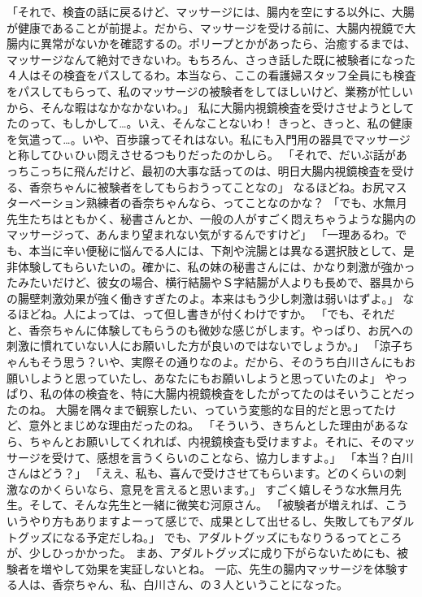 「それで、検査の話に戻るけど、マッサージには、腸内を空にする以外に、大腸が健康であることが前提よ。だから、マッサージを受ける前に、大腸内視鏡で大腸内に異常がないかを確認するの。ポリープとかがあったら、治癒するまでは、マッサージなんて絶対できないわ。もちろん、さっき話した既に被験者になった４人はその検査をパスしてるわ。本当なら、ここの看護婦スタッフ全員にも検査をパスしてもらって、私のマッサージの被験者をしてほしいけど、業務が忙しいから、そんな暇はなかなかないわ。」
私に大腸内視鏡検査を受けさせようとしてたのって、もしかして…。いえ、そんなことないわ！
きっと、きっと、私の健康を気遣って…。いや、百歩譲ってそれはない。私にも入門用の器具でマッサージと称してひぃひぃ悶えさせるつもりだったのかしら。
「それで、だいぶ話があっちこっちに飛んだけど、最初の大事な話ってのは、明日大腸内視鏡検査を受ける、香奈ちゃんに被験者をしてもらおうってことなの」
なるほどね。お尻マスターベーション熟練者の香奈ちゃんなら、ってことなのかな？
「でも、水無月先生たちはともかく、秘書さんとか、一般の人がすごく悶えちゃうような腸内のマッサージって、あんまり望まれない気がするんですけど」
「一理あるわ。でも、本当に辛い便秘に悩んでる人には、下剤や浣腸とは異なる選択肢として、是非体験してもらいたいの。確かに、私の妹の秘書さんには、かなり刺激が強かったみたいだけど、彼女の場合、横行結腸やＳ字結腸が人よりも長めで、器具からの腸壁刺激効果が強く働きすぎたのよ。本来はもう少し刺激は弱いはずよ。」
なるほどね。人によっては、って但し書きが付くわけですか。
「でも、それだと、香奈ちゃんに体験してもらうのも微妙な感じがします。やっぱり、お尻への刺激に慣れていない人にお願いした方が良いのではないでしょうか。」
「涼子ちゃんもそう思う？いや、実際その通りなのよ。だから、そのうち白川さんにもお願いしようと思っていたし、あなたにもお願いしようと思っていたのよ」
やっぱり、私の体の検査を、特に大腸内視鏡検査をしたがってたのはそいうことだったのね。
大腸を隅々まで観察したい、っていう変態的な目的だと思ってたけど、意外とまじめな理由だったのね。
「そういう、きちんとした理由があるなら、ちゃんとお願いしてくれれば、内視鏡検査も受けますよ。それに、そのマッサージを受けて、感想を言うくらいのことなら、協力しますよ。」
「本当？白川さんはどう？」
「ええ、私も、喜んで受けさせてもらいます。どのくらいの刺激なのかくらいなら、意見を言えると思います。」
すごく嬉しそうな水無月先生。そして、そんな先生と一緒に微笑む河原さん。
「被験者が増えれば、こういうやり方もありますよーって感じで、成果として出せるし、失敗してもアダルトグッズになる予定だしね。」
でも、アダルトグッズにもなりうるってところが、少しひっかかった。
まあ、アダルトグッズに成り下がらないためにも、被験者を増やして効果を実証しないとね。
一応、先生の腸内マッサージを体験する人は、香奈ちゃん、私、白川さん、の３人ということになった。
